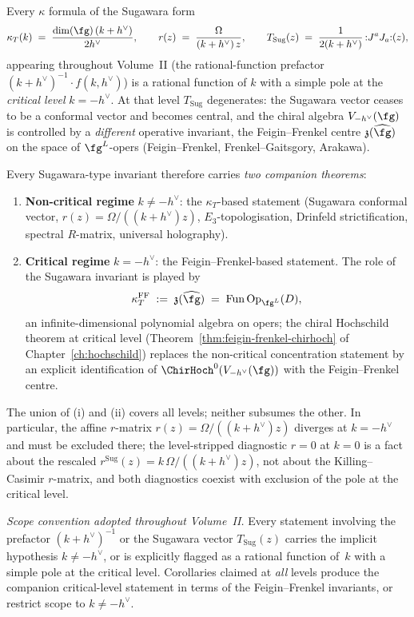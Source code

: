 \begin{remark}
\label{rem:critical-level-exclusion-discipline}
Every $\kappa$ formula of the Sugawara form
\[
 \kappa_T(k) \;=\; \frac{\dim(\fg)\,(k+h^\vee)}{2h^\vee},
 \qquad
 r(z) \;=\; \frac{\Omega}{(k+h^\vee)\,z},
 \qquad
 T_{\mathrm{Sug}}(z) \;=\; \frac{1}{2(k+h^\vee)}\,{:}J^a J_a{:}(z),
\]
appearing throughout Volume~II (the rational-function prefactor
$(k+h^\vee)^{-1}\cdot f(k,h^\vee)$) is a rational function of $k$
with a simple pole at the \emph{critical level} $k=-h^\vee$.
At that level $T_{\mathrm{Sug}}$ degenerates: the Sugawara vector
ceases to be a conformal vector and becomes central, and the
chiral algebra $V_{-h^\vee}(\fg)$ is controlled by a
\emph{different} operative invariant, the Feigin--Frenkel centre
$\mathfrak{z}(\widehat{\fg})$ on the space of $\fg^L$-opers
(Feigin--Frenkel, Frenkel--Gaitsgory, Arakawa).

Every Sugawara-type invariant therefore carries \emph{two companion
theorems}:
\begin{enumerate}
\item[(i)] \textbf{Non-critical regime} $k\neq -h^\vee$: the
$\kappa_T$-based statement (Sugawara conformal vector,
$r(z)=\Omega/((k+h^\vee)z)$, $E_3$-topologisation,
Drinfeld strictification, spectral $R$-matrix, universal
holography).
\item[(ii)] \textbf{Critical regime} $k=-h^\vee$: the
Feigin--Frenkel-based statement. The role of the Sugawara
invariant is played by
\[
 \kappa_T^{\mathrm{FF}} \;:=\; \mathfrak{z}(\widehat{\fg})
 \;=\; \mathrm{Fun}\,\mathrm{Op}_{\fg^L}(D),
\]
an infinite-dimensional polynomial algebra on opers; the chiral
Hochschild theorem at critical level
(Theorem~\ref{thm:feigin-frenkel-chirhoch} of
Chapter~\ref{ch:hochschild}) replaces the non-critical
concentration statement by an explicit identification of
$\ChirHoch^0(V_{-h^\vee}(\fg))$ with the Feigin--Frenkel centre.
\end{enumerate}
The union of (i) and (ii) covers all levels; neither subsumes
the other. In particular, the affine $r$-matrix
$r(z)=\Omega/((k+h^\vee)z)$ diverges at $k=-h^\vee$ and must be
excluded there; the level-stripped diagnostic $r = 0$ at $k=0$ is a
fact about the rescaled $r^{\mathrm{Sug}}(z) = k\,\Omega/((k+h^\vee)z)$,
not about the Killing--Casimir $r$-matrix, and both diagnostics
coexist with exclusion of the pole at the critical level.

\emph{Scope convention adopted throughout Volume~II.} Every statement
involving the prefactor $(k+h^\vee)^{-1}$ or the Sugawara vector
$T_{\mathrm{Sug}}(z)$ carries the implicit hypothesis $k\neq -h^\vee$,
or is explicitly flagged as a rational function of~$k$ with a simple
pole at the critical level. Corollaries claimed at \emph{all} levels
produce the companion critical-level statement in terms of the
Feigin--Frenkel invariants, or restrict scope to $k\neq -h^\vee$.


\end{remark}
